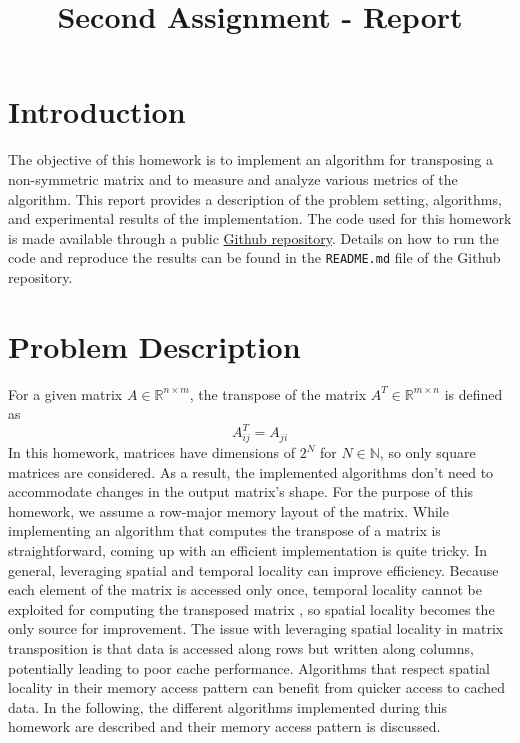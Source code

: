 \documentclass[conference]{IEEEtran}
\begin{document}
    \title{Second Assignment - Report}
    \author{
    }
    \maketitle

    \setcounter{page}{1}

    \section{Introduction}    
    The objective of this homework is to implement an algorithm for transposing a non-symmetric matrix and to measure and analyze various metrics of the algorithm. This report provides a description of the problem setting, algorithms, and experimental results of the implementation.
    The code used for this homework is made available through a public \href{https://github.com/chrisdalvit/gpu-matrix-transpose-benchmark}{Github repository}. Details on how to run the code and reproduce the results can be found in the \texttt{README.md} file of the Github repository.

    \section{Problem Description}
    For a given matrix $A \in \mathbb{R}^{n \times m}$, the transpose of the matrix $A^T \in \mathbb{R}^{m \times n}$ is defined as
    $$
        A^T_{ij} = A_{ji}
    $$
    In this homework, matrices have dimensions of $2^N$ for $N \in \mathbb{N}$, so only square matrices are considered. As a result, the implemented algorithms don't need to accommodate changes in the output matrix's shape. For the purpose of this homework, we assume a row-major memory layout of the matrix.
    While implementing an algorithm that computes the transpose of a matrix is straightforward, coming up with an efficient implementation is quite tricky. In general, leveraging spatial and temporal locality can improve efficiency. Because each element of the matrix is accessed only once, temporal locality cannot be exploited for computing the transposed matrix \cite{chatterjee2000cache}, so spatial locality becomes the only source for improvement. The issue with leveraging spatial locality in matrix transposition is that data is accessed along rows but written along columns, potentially leading to poor cache performance. Algorithms that respect spatial locality in their memory access pattern can benefit from quicker access to cached data. In the following, the different algorithms implemented during this homework are described and their memory access pattern is discussed.
\end{document}
